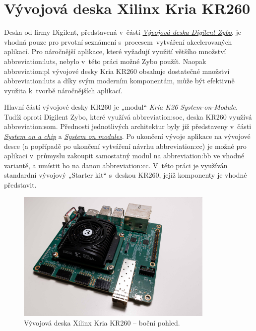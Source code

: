 \documentclass[a4paper, twoside, 11pt]{article}
\begin{document}
		\section{Vývojová deska Xilinx Kria KR260}
				Deska od firmy Digilent, představená v~části \hyperref[sec:vyvojova-deska-digilent-zybo]{\textit{Vývojová deska Digilent Zybo}}, je vhodná pouze pro prvotní seznámení s~procesem~vytváření akcelerovaných aplikací. Pro náročnější aplikace, které vyžadují využití většího množství \gls{abbreviation:luts}, nebylo v~této práci možné Zybo použít. Naopak \gls{abbreviation:pl} vývojové desky Kria KR260 obsahuje dostatečné množství \gls{abbreviation:luts} a díky svým moderním komponentám, může být efektivně využita k~tvorbě náročnějších aplikací.\par
				Hlavní částí vývojové desky KR260 je „modul“ \textit{Kria K26 System-on-Module}. Tudíž oproti Digilent Zybo, které využívá \gls{abbreviation:soc}, deska KR260 využívá \gls{abbreviation:som}. Přednosti jednotlivých architektur byly již představeny v~části \hyperref[sec:system-on-a-chip]{\textit{System on a chip}} a \hyperref[sec:system-on-modules]{\textit{System on modules}}. Po ukončení vývoje aplikace na vývojové desce (a popřípadě po ukončení vytváření návrhu \gls{abbreviation:cc}) je možné pro aplikaci v~průmyslu zakoupit samostatný modul na \gls{abbreviation:bb} ve vhodné variantě, a umístit ho na danou \gls{abbreviation:cc}. V~této práci je využíván standardní vývojový „Starter kit“ s~deskou KR260, jejíž komponenty je vhodné představit.

				\begin{figure}[H]
					\centering
						\includegraphics[width=0.85\textwidth]{src/jpg/xilinx-kria-foto-1.jpeg} 
						\caption{Vývojová deska Xilinx Kria KR260 – boční pohled.}
						\label{fig:xilinx-kria-foto-1}
				\end{figure}
\end{document}
